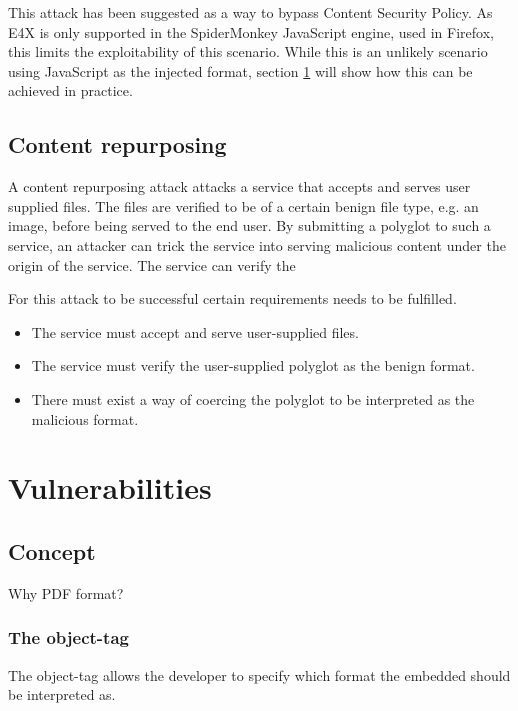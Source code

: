 \documentclass[10pt, conference, compsocconf]{IEEEtran}
\begin{document}
This attack has been suggested as a way to bypass Content Security Policy. As E4X is only supported in the SpiderMonkey JavaScript engine, used in Firefox, this limits the exploitability of this scenario.
While this is an unlikely scenario using JavaScript as the injected format, section \ref{sec:vuln} will show how this can be achieved in practice.

\subsection{Content repurposing}

A content repurposing attack attacks a service that accepts and serves user supplied files. The files are verified to be of a certain benign file type, e.g. an image, before being served to the end user. By submitting a polyglot to such a service, an attacker can trick the service into serving malicious content under the origin of the service. The service can verify the

For this attack to be successful certain requirements needs to be 
fulfilled. 

\begin{itemize}
	\item The service must accept and serve user-supplied files.
	\item The service must verify the user-supplied polyglot as the benign 
				format.
	\item There must exist a way of coercing the polyglot to be 
				interpreted as the malicious format.
\end{itemize}


\section{Vulnerabilities}
\label{sec:vuln}

\subsection{Concept}


Why PDF format?

\subsubsection{The object-tag}

The object-tag allows the developer to specify which format 
the embedded should be interpreted as. 
\end{document}
